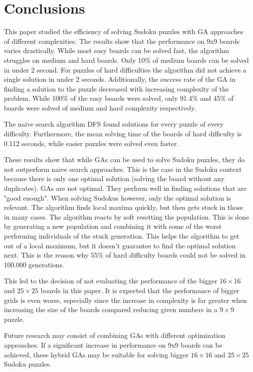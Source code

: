 \section{Conclusions}
\label{sec:conclusions}

This paper studied the efficiency of solving Sudoku puzzles with GA approaches of different complexities. The results show that the performance on 9x9 boards varies drastically. While most easy boards can be solved fast, the algorithm struggles on medium and hard boards. Only 10\% of medium boards can be solved in under 2 second. For puzzles of hard difficulties the algorithm did not achieve a single solution in under 2 seconds. Additionally, the success rate of the GA in finding a solution to the puzzle decreased with increasing complexity of the problem. While 100\% of the easy boards were solved, only 91.4\% and 45\% of boards were solved of medium and hard complexity respectively. 

The naive search algorithm DFS found solutions for every puzzle of every difficulty. Furthermore, the mean solving time of the boards of hard difficulty is 0.112 seconds, while easier puzzles were solved even faster. 

These results show that while GAs can be used to solve Sudoku puzzles, they do not outperform naive search approaches. This is the case in the Sudoku context because there is only one optimal solution (solving the board without any duplicates). GAs are not optimal. They perform well in finding solutions that are "good enough". When solving Sudokus however, only the optimal solution is relevant. The algorithm finds local maxima quickly, but then gets stuck in those in many cases. The algorithm reacts by soft resetting the population. This is done by generating a new population and combining it with some of the worst performing individuals of the stuck generation. This helps the algorithm to get out of a local maximum, but it doesn't guarantee to find the optimal solution next. This is the reason why 55\% of hard difficulty boards could not be solved in 100.000 generations.

This led to the decision of not evaluating the performance of the bigger $16 \times 16$ and $25 \times 25$ boards in this paper. It is expected that the performance of bigger grids is even worse, especially since the increase in complexity is far greater when increasing the size of the boards compared reducing given numbers in a $9 \times 9$ puzzle.

Future research may consist of combining GAs with different optimization approaches. If a significant increase in performance on 9x9 boards can be achieved, these hybrid GAs may be suitable for solving bigger $16 \times 16$ and $25 \times 25$ Sudoku puzzles.